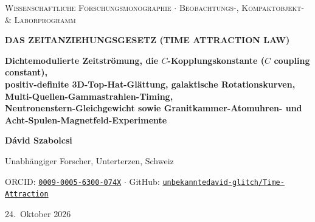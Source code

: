 \documentclass[10pt,a4paper]{article}
\begin{document}
\thispagestyle{empty}
\vspace*{-2mm}
\noindent{\color{navy}\rule{\linewidth}{2pt}}\par\vspace{1.5mm}
\begin{center}
  {\footnotesize\scshape\color{slate}Wissenschaftliche Forschungsmonographie $\cdot$ Beobachtungs-, Kompaktobjekt- \& Laborprogramm}\par\vspace{1.5mm}
  {\Large\bfseries\color{navy}DAS ZEITANZIEHUNGSGESETZ (TIME ATTRACTION LAW)}\par\vspace{1.2mm}
  {\large\bfseries\color{slate}Dichtemodulierte Zeitstr\"omung, die $C$-Kopplungskonstante ($C$ coupling constant),}\\
  {\large\bfseries\color{slate}positiv-definite 3D-Top-Hat-Gl\"attung, galaktische Rotationskurven, Multi-Quellen-Gammastrahlen-Timing,}\\
  {\large\bfseries\color{slate}Neutronenstern-Gleichgewicht sowie Granitkammer-Atomuhren- und Acht-Spulen-Magnetfeld-Experimente}\par\vspace{2mm}
  {\normalsize\bfseries D\'avid Szabolcsi}\par\vspace{1mm}
  {\small Unabh\"angiger Forscher, Unterterzen, Schweiz}\par
  {\small ORCID: \href{https://orcid.org/0009-0005-6300-074X}{\texttt{0009-0005-6300-074X}} $\cdot$ GitHub: \href{https://github.com/unbekanntedavid-glitch/Time-Attraction}{\texttt{unbekanntedavid-glitch/Time-Attraction}}}\par
  {\small 24.\ Oktober 2026}
\end{center}
\vspace{1.5mm}
\noindent{\color{navy}\rule{\linewidth}{0.8pt}}\par\vspace{1mm}
\end{document}
